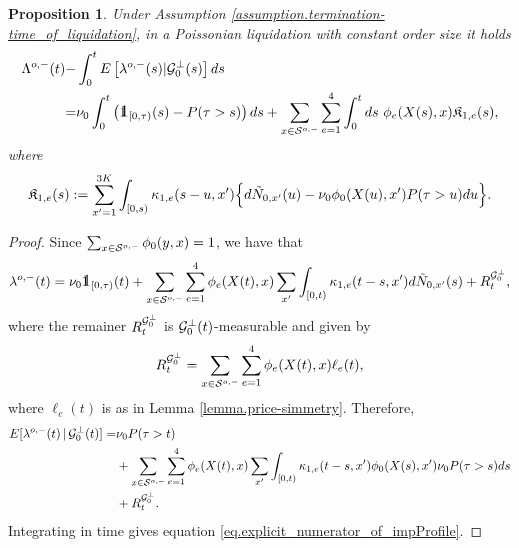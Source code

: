 \documentclass[10pt, article,table]{article}
\newtheorem{prop}[thm]{Proposition}
\begin{document}
\begin{prop}\label{prop.impact_poisson_and_constant-size}
 Under Assumption \ref{assumption.termination-time_of_liquidation}, in a Poissonian liquidation with constant order size 
 it holds
 \begin{equation}\label{eq.explicit_numerator_of_impProfile}
 \begin{split}
  \weakDeflCompensator(t) 
    -& \intzerot\Expectation\left[\weakDeflIntensity(s)\vert \liquidatorSigmaAlgebra\orthogonal(s)\right]ds
\\
=&
\baseRate_{0}\intzerot \left(\one_{[0,\terminationTime)} (s) - \Prob(\terminationTime>s)\right)ds
+
\sum_{x\in\weakDeflSpace} \sum_{e=1}^{4}
\intzerot ds \, \, \transProb_{e}(\stateVariable(s),x)\Kappa_{1,e}(s),
\end{split}
 \end{equation}
 where 
 \begin{equation*}
  \mathfrak{K}_{1,e}(s) :=
\sum_{x^{\prime}=1}^{3K}\int_{[0,s)}\kappa_{1,e}(s-u, x^{\prime})
\Big\lbrace
d\tilde{N}_{0,x^{\prime}}(u)
- \nu_{0}\phi_{0}(X(u),x^{\prime}){{P}}(\tau>u) du
\Big\rbrace.
 \end{equation*}
\end{prop}
\begin{proof}
 Since $\sum_{x\in\mathcal{S}^{o,-}}\phi_{0}(y,x) = 1$, we have that 
 \begin{equation*}
  \weakDeflIntensity(t)
  =
  \baseRate_{0} \one_{[0,\terminationTime)} (t)
  + \sum_{x\in\weakDeflSpace} \sum_{e=1}^{4}
  \transProb_e(\stateVariable(t),x)\sum_{\xone} \int_{[0,t)} \hawkesKernel_{1,e}(t-s, \xone) d\hybridHawkes_{0,\xone}(s)
  + R_{t}^{\sigmaAlgebraG_{0}\orthogonal},
 \end{equation*}
where the remainer $R_{t}^{\mathcal{G}_{0}^{\perp}}$ is $\mathcal{G}_{0}^{\perp}(t)$-measurable and given by
\begin{equation*}
 R_{t}^{\mathcal{G}_{0}^{\perp}}
 =
 \sum_{x\in\mathcal{S}^{o,-}}\sum_{e=1}^{4}
 \phi_{e}(X(t),x) \ell_{e}(t),
\end{equation*}
where $\ell_e(t)$ is as in Lemma \ref{lemma.price-simmetry}. Therefore, 
\begin{equation*}
 \begin{split}
  {{E}}[\lambda_{}^{o,-}(t)\,\vert\, \mathcal{G}_{0}^{\perp}(t) ]
  =& 
  \nu_{0} {{P}}(\tau > t)
  \\
  &+
  \sum_{x\in\mathcal{S}^{o,-}} \sum_{e=1}^{4}
  \phi_e(X(t),x)\sum_{x^{\prime}} \int_{[0,t)} \kappa_{1,e}(t-s, x^{\prime}) \phi_{0}(X(s),x^{\prime}) \nu_{0}{{P}}(\tau>s) ds
  \\
  &+ R^{\mathcal{G}_{0}^{\perp}}_{t}.
 \end{split}
\end{equation*}
Integrating in time gives equation \eqref{eq.explicit_numerator_of_impProfile}.
\end{proof}
\end{document}
